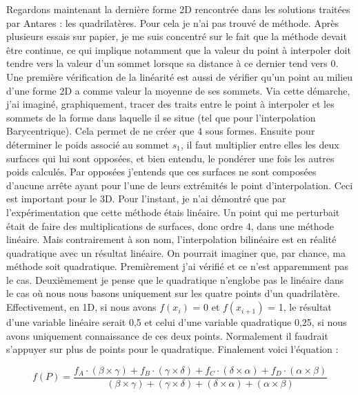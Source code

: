 Regardons maintenant la dernière forme 2D rencontrée dans les solutions traitées par Antares : les quadrilatères.
Pour cela je n'ai pas trouvé de méthode. Après plusieurs essais sur papier, je me suis concentré sur le fait que la méthode devait être continue, ce qui implique notamment que la valeur du point à interpoler doit tendre vers la valeur d'un sommet lorsque sa distance à ce dernier tend vers 0.
Une première vérification de la linéarité est aussi de vérifier qu'un point au milieu d'une forme 2D a comme valeur la moyenne de ses sommets.
Via cette démarche, j'ai imaginé, graphiquement, tracer des traits entre le point à interpoler et les sommets de la forme dans laquelle il se situe (tel que pour l'interpolation Barycentrique).
Cela permet de ne créer que 4 sous formes.
Ensuite pour déterminer le poids associé au sommet \( s_1 \), il faut multiplier entre elles les deux surfaces qui lui sont opposées, et bien entendu, le pondérer une fois les autres poids calculés.
Par opposées j'entends que ces surfaces ne sont composées d'aucune arrête ayant pour l'une de leurs extrémités le point d'interpolation. Ceci est important pour le 3D. Pour l'instant, je n'ai démontré que par l'expérimentation que cette méthode étais linéaire.
Un point qui me perturbait était de faire des multiplications de surfaces, donc ordre 4, dans une méthode linéaire.
Mais contrairement à son nom, l'interpolation bilinéaire est en réalité quadratique avec un résultat linéaire.
On pourrait imaginer que, par chance, ma méthode soit quadratique.
Premièrement j'ai vérifié et ce n'est apparemment pas le cas.
Deuxièmement je pense que le quadratique n'englobe pas le linéaire dans le cas où nous nous basons uniquement sur les quatre points d'un quadrilatère. Effectivement, en 1D, si nous avons \(f(x_i)\) = 0 et \(f(x_{i+1})\) = 1, le résultat d'une variable linéaire serait 0,5 et celui d'une variable quadratique 0,25, si nous avons uniquement connaissance de ces deux points.
Normalement il faudrait s'appuyer sur plus de points pour le quadratique. Finalement voici l'équation :

\begin{equation}
    f(P) = \frac{f_{A} \cdot (\beta \times \gamma) + f_{B} \cdot (\gamma \times \delta) + f_{C} \cdot (\delta \times \alpha) + f_{D} \cdot (\alpha \times \beta)}{(\beta \times \gamma) + (\gamma \times \delta) + (\delta \times \alpha) + (\alpha \times \beta)}
\end{equation}
    

